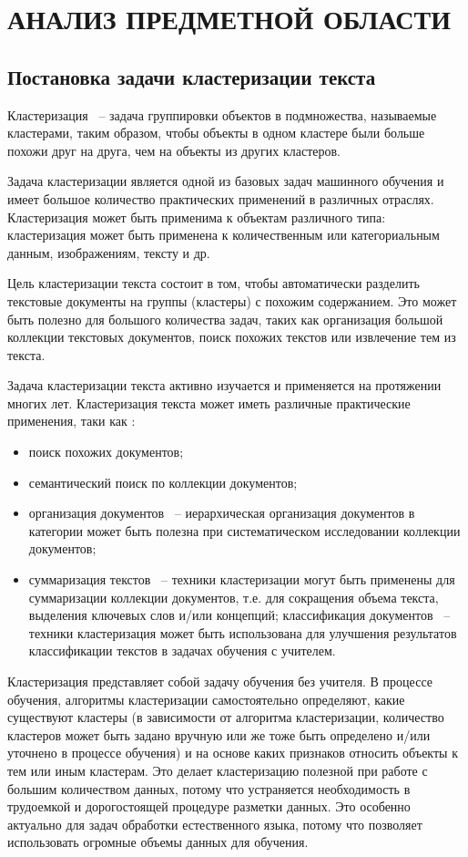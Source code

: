 \chapter{АНАЛИЗ ПРЕДМЕТНОЙ ОБЛАСТИ}
\aftertitle

\section{Постановка задачи кластеризации текста}

Кластеризация ~-- задача группировки объектов в подмножества, называемые кластерами, таким образом, чтобы объекты в одном кластере были больше похожи друг на друга, чем на объекты из других кластеров.

Задача кластеризации является одной из базовых задач машинного обучения и имеет большое количество практических применений в различных отраслях. Кластеризация может быть применима к объектам различного типа: кластеризация может быть применена к количественным или категориальным данным, изображениям, тексту и др.

Цель кластеризации текста состоит в том, чтобы автоматически разделить текстовые документы на группы (кластеры) с похожим содержанием. Это может быть полезно для большого количества задач, таких как организация большой коллекции текстовых документов, поиск похожих текстов или извлечение тем из текста.

Задача кластеризации текста активно изучается и применяется на протяжении многих лет. Кластеризация текста может иметь различные практические применения, таки как \cite{text-clustering-survey}:
\begin{itemize}
    \item поиск похожих документов;
    \item семантический поиск по коллекции документов;
    \item организация документов ~-- иерархическая организация документов в категории может быть полезна при систематическом исследовании коллекции документов;
    \item суммаризация текстов ~-- техники кластеризации могут быть применены для суммаризации коллекции документов, т.е. для сокращения объема текста, выделения ключевых слов и/или концепций;
     классификация документов ~-- техники кластеризация может быть использована для улучшения результатов классификации текстов в задачах обучения с учителем.
\end{itemize}

Кластеризация представляет собой задачу обучения без учителя. В процессе обучения, алгоритмы кластеризации самостоятельно определяют, какие существуют кластеры (в зависимости от алгоритма кластеризации, количество кластеров может быть задано вручную или же тоже быть определено и/или уточнено в процессе обучения) и на основе каких признаков относить объекты к тем или иным кластерам. Это делает кластеризацию полезной при работе с большим количеством данных, потому что устраняется необходимость в трудоемкой и дорогостоящей процедуре разметки данных. Это особенно актуально для задач обработки естественного языка, потому что позволяет использовать огромные объемы данных для обучения.

